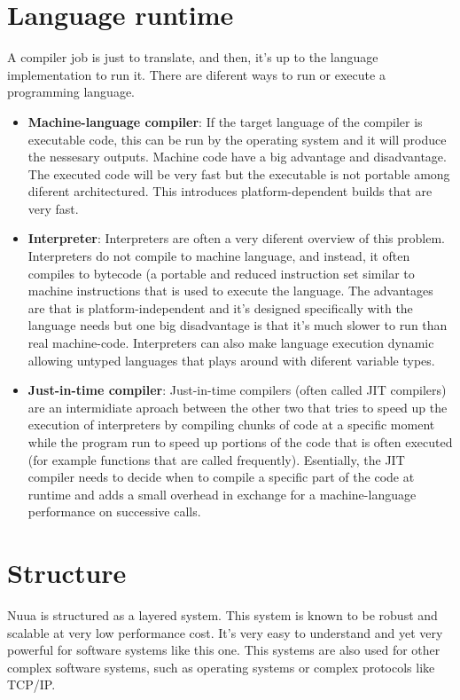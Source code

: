 \section{Language runtime}

A compiler job is just to translate, and then, it's up to the language implementation to run it. There are diferent ways to
run or execute a programming language.

\begin{itemize}
    \item \textbf{Machine-language compiler}: If the target language of the compiler is executable code, this can be run
        by the operating system and it will produce the nessesary outputs. Machine code have a big advantage and disadvantage.
        The executed code will be very fast but the executable is not portable among diferent architectured. This introduces
        platform-dependent builds that are very fast.
    \item \textbf{Interpreter}: Interpreters are often a very diferent overview of this problem. Interpreters do not compile
        to machine language, and instead, it often compiles to bytecode (a portable and reduced instruction set similar to machine instructions
        that is used to execute the language. The advantages are that is platform-independent and it's designed specifically with the language
        needs but one big disadvantage is that it's much slower to run than real machine-code. Interpreters can also make language execution
        dynamic allowing untyped languages that plays around with diferent variable types.
    \item \textbf{Just-in-time compiler}: Just-in-time compilers (often called JIT compilers) are an intermidiate aproach between the other two
        that tries to speed up the execution of interpreters by compiling chunks of code at a specific moment while the program run to speed up portions
        of the code that is often executed (for example functions that are called frequently). Esentially, the JIT compiler needs to decide when to compile
        a specific part of the code at runtime and adds a small overhead in exchange for a machine-language performance on successive calls.
\end{itemize}

\section{Structure}

Nuua is structured as a layered system. This system is known to be robust and scalable at very low
performance cost. It's very easy to understand and yet very powerful for software systems like this one.
This systems are also used for other complex software systems, such as operating systems or complex
protocols like TCP/IP.

